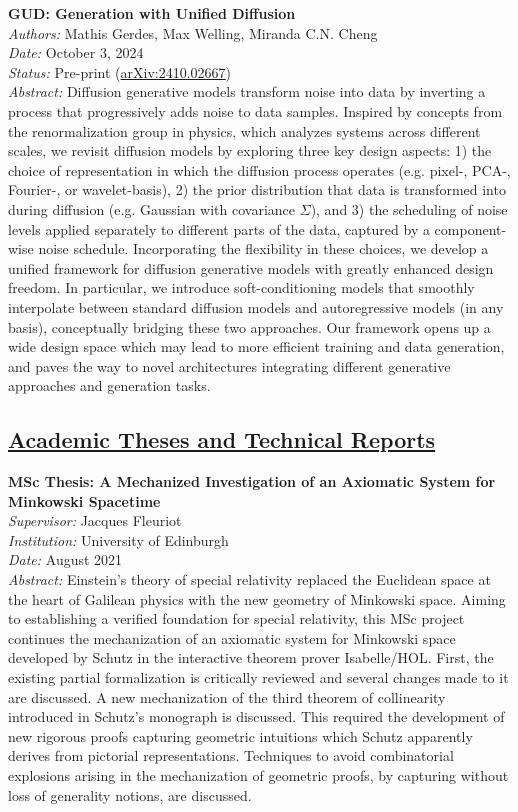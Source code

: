 \documentclass[11pt]{article}
\begin{document}
\textbf{GUD: Generation with Unified Diffusion}\\
\textit{Authors:} Mathis Gerdes, Max Welling, Miranda C.N. Cheng\\
\textit{Date:} October 3, 2024\\
\textit{Status:} Pre-print (\href{https://arxiv.org/abs/2410.02667}{arXiv:2410.02667})\\
\textit{Abstract:} Diffusion generative models transform noise into data by inverting a process that progressively adds noise to data samples. Inspired by concepts from the renormalization group in physics, which analyzes systems across different scales, we revisit diffusion models by exploring three key design aspects: 1) the choice of representation in which the diffusion process operates (e.g. pixel-, PCA-, Fourier-, or wavelet-basis), 2) the prior distribution that data is transformed into during diffusion (e.g. Gaussian with covariance $\Sigma$), and 3) the scheduling of noise levels applied separately to different parts of the data, captured by a component-wise noise schedule. Incorporating the flexibility in these choices, we develop a unified framework for diffusion generative models with greatly enhanced design freedom. In particular, we introduce soft-conditioning models that smoothly interpolate between standard diffusion models and autoregressive models (in any basis), conceptually bridging these two approaches. Our framework opens up a wide design space which may lead to more efficient training and data generation, and paves the way to novel architectures integrating different generative approaches and generation tasks.


\subsection*{\underline{Academic Theses and Technical Reports}}

\textbf{MSc Thesis: A Mechanized Investigation of an Axiomatic System for Minkowski Spacetime}\\
\textit{Supervisor:} Jacques Fleuriot\\
\textit{Institution:} University of Edinburgh\\
\textit{Date:} August 2021 \\
\textit{Abstract:} Einstein's theory of special relativity replaced the Euclidean space at the heart of Galilean physics with the new geometry of Minkowski space. Aiming to establishing a verified foundation for special relativity, this MSc project continues the mechanization of an axiomatic system for Minkowski space developed by Schutz in the interactive theorem prover Isabelle/HOL. First, the existing partial formalization is critically reviewed and several changes made to it are discussed. A new mechanization of the third theorem of collinearity introduced in Schutz's monograph is discussed. This required the development of new rigorous proofs capturing geometric intuitions which Schutz apparently derives from pictorial representations. Techniques to avoid combinatorial explosions arising in the mechanization of geometric proofs, by capturing without loss of generality notions, are discussed.
\end{document}
